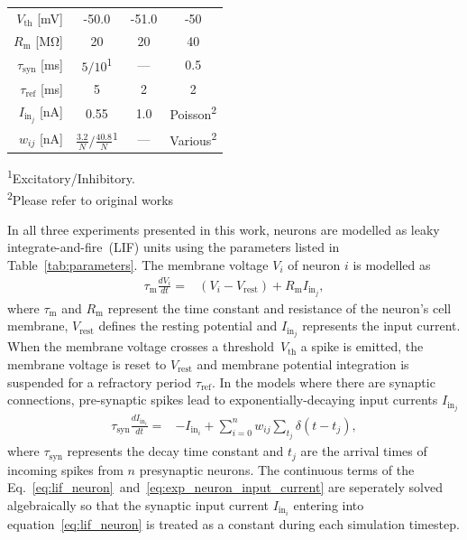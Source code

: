 \documentclass[9pt,twocolumn,twoside,lineno]{pnas-new}
\begin{document}
{\begin{table}
\begin{tabular}{r S S S}
        $V_{\text{th}}$ [\si{\milli\volt}]         & -50.0                     & -51.0             & -50 \\
        $R_{\text{m}}$ [\si{\mega\ohm}]                  & 20                        & 20                & 40 \\
        $\tau_{\text{syn}}$ [\si{\milli\second}]       & {$5/10$\textsuperscript{1}} & {---}             & 0.5\\
        $\tau_{\text{ref}}$ [\si{\milli\second}]       & 5                         & 2                 & 2 \\
        $I_{\text{in}_j}$ [\si{\nano\ampere}]           & 0.55                      & 1.0    & {Poisson\textsuperscript{2}}\\
        $w_{ij}$ [\si{\nano\ampere}]            & {$\frac{3.2}{N}/\frac{40.8}{N}$\textsuperscript{1}}           & {---}            & {Various\textsuperscript{2}}\\
    \bottomrule
  \end{tabular}
  \parbox{\columnwidth}{\textsuperscript{1}Excitatory/Inhibitory. \\
  \textsuperscript{2}Please refer to original works~\citep[Table 1,2]{Schmidt2018}}
\end{table}
In all three experiments presented in this work, neurons are modelled as leaky integrate-and-fire~(LIF) units using the parameters listed in Table~\ref{tab:parameters}.
The membrane voltage $V_{i}$ of neuron $i$ is modelled as
%
\begin{align}
    \tau_{\text{m}} \frac{dV_{i}}{dt} = & (V_{i} - V_{\text{rest}}) + R_{\text{m}} I_{\text{in}_{j}}, \label{eq:lif_neuron}
\end{align}
%
where $\tau_{\text{m}}$ and $R_{\text{m}}$ represent the time constant and resistance of the neuron's cell membrane, $V_{\text{rest}}$ defines the resting potential and $I_{\text{in}_{j}}$ represents the input current.
When the membrane voltage crosses a threshold~$V_{\text{th}}$ a spike is emitted, the membrane voltage is reset to $V_{\text{rest}}$ and membrane potential integration is suspended for a refractory period $\tau_{\text{ref}}$.
In the models where there are synaptic connections, pre-synaptic spikes lead to exponentially-decaying input currents $I_{\text{in}_{j}}$
%
\begin{align}
    \tau_{\text{syn}} \frac{dI_{\text{in}_{i}}}{dt} = & -I_{\text{in}_{i}} + \sum_{i=0}^{n} w_{ij} \sum_{t_{j}}  \delta(t - t_{j}),\label{eq:exp_neuron_input_current}
\end{align}
%
where $\tau_{\text{syn}}$ represents the decay time constant and $t_{j}$ are the arrival times of incoming spikes from $n$ presynaptic neurons.
The continuous terms of the Eq.~\ref{eq:lif_neuron}~and~\ref{eq:exp_neuron_input_current} are seperately solved algebraically so that the synaptic input current $I_{\text{in}_{i}}$ entering into equation~\ref{eq:lif_neuron} is treated as a constant during each simulation timestep.}
\showmatmethods{} %
\end{document}
